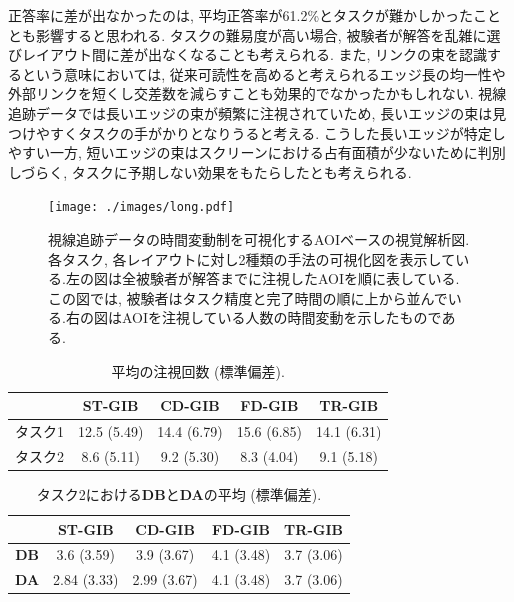 \documentclass{kuee}
\begin{document}
正答率に差が出なかったのは, 平均正答率が61.2\%とタスクが難かしかったこととも影響すると思われる.
タスクの難易度が高い場合, 被験者が解答を乱雑に選びレイアウト間に差が出なくなることも考えられる.
また, リンクの束を認識するという意味においては, 従来可読性を高めると考えられるエッジ長の均一性や外部リンクを短くし交差数を減らすことも効果的でなかったかもしれない.
視線追跡データでは長いエッジの束が頻繁に注視されていため, 長いエッジの束は見つけやすくタスクの手がかりとなりうると考える.
こうした長いエッジが特定しやすい一方, 短いエッジの束はスクリーンにおける占有面積が少ないために判別しづらく, タスクに予期しない効果をもたらしたとも考えられる.


\begin{figure}
  \begin{center}
    \texttt{[image: ./images/long.pdf]}
    \caption{視線追跡データの時間変動制を可視化するAOIベースの視覚解析図.各タスク, 各レイアウトに対し2種類の手法の可視化図を表示している.左の図は全被験者が解答までに注視したAOIを順に表している.この図では, 被験者はタスク精度と完了時間の順に上から並んでいる.右の図はAOIを注視している人数の時間変動を示したものである.\label{fig:AOI-based-analisys}}
  \end{center}
\end{figure}

\begin{table}[b]
  \begin{center}
  \caption{平均の注視回数 (標準偏差). \label{table:gazecount-task12}}
  \begin{tabular}{|c|c|c|c|c|} \hline
  & ST-GIB & CD-GIB & FD-GIB & TR-GIB \\ \hline
  タスク1 & 12.5 (5.49) & 14.4 (6.79) & 15.6 (6.85) & 14.1 (6.31) \\ \hline
  タスク2 & 8.6 (5.11) & 9.2 (5.30) & 8.3 (4.04) & 9.1 (5.18) \\ \hline
  \end{tabular}
  \end{center}
\end{table}

\begin{table}[b]
  \begin{center}
  \caption{タスク2における{\bf DB}と{\bf DA}の平均 (標準偏差). \label{table:db_and_da_task12}}
  \begin{tabular}{|c|c|c|c|c|} \hline
  & ST-GIB & CD-GIB & FD-GIB & TR-GIB \\ \hline
  {\bf DB} & 3.6 (3.59) & 3.9 (3.67) & 4.1 (3.48) & 3.7 (3.06) \\ \hline
  {\bf DA} & 2.84 (3.33) & 2.99 (3.67) & 4.1 (3.48) & 3.7 (3.06) \\ \hline
  \end{tabular}
  \end{center}
\end{table}
\end{document}
